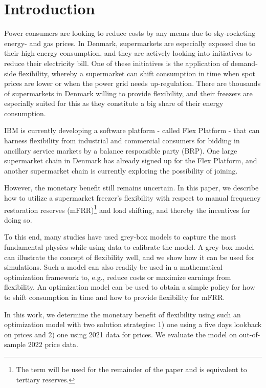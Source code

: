\section{Introduction}

Power consumers are looking to reduce costs by any means due to sky-rocketing energy- and gas prices. In Denmark, supermarkets are especially exposed due to their high energy consumption, and they are actively looking into initiatives to reduce their electricity bill. One of these initiatives is the application of demand-side flexibility, whereby a supermarket can shift consumption in time when spot prices are lower or when the power grid needs up-regulation. There are thousands of supermarkets in Denmark willing to provide flexibility, and their freezers are especially suited for this as they constitute a big share of their energy consumption. 

IBM is currently developing a software platform - called Flex Platform - that can harness flexibility from industrial and commercial consumers for bidding in ancillary service markets by a balance responsible party (BRP). One large supermarket chain in Denmark has already signed up for the Flex Platform, and another supermarket chain is currently exploring the possibility of joining. 

However, the monetary benefit still remains uncertain. In this paper, we describe how to utilize a supermarket freezer's flexibility with respect to manual frequency restoration reserves (mFRR)\footnote{The term will be used for the remainder of the paper and is equivalent to tertiary reserves.} and load shifting, and thereby the incentives for doing so.

To this end, many studies have used grey-box models to capture the most fundamental physics while using data to calibrate the model. A grey-box model can illustrate the concept of flexibility well, and we show how it can be used for simulations. Such a model can also readily be used in a mathematical optimization framework to, e.g., reduce costs or maximize earnings from flexibility. An optimization model can be used to obtain a simple policy for how to shift consumption in time and how to provide flexibility for mFRR. 

In this work, we determine the monetary benefit of flexibility using such an optimization model with two solution strategies: 1) one using a five days lookback on prices and 2) one using 2021 data for prices. We evaluate the model on out-of-sample 2022 price data.

